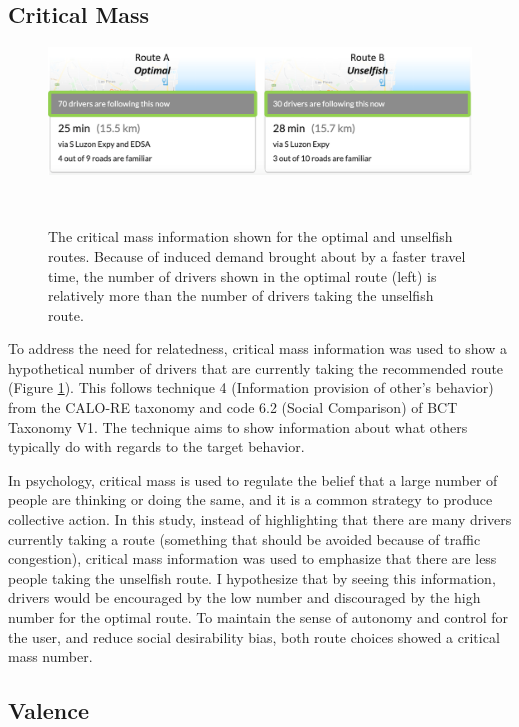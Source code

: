 \subsection{Critical Mass}
\begin{figure}[h]
\centering
  \includegraphics[scale=0.4]{figures/s3-critimass.png}
  \caption{The critical mass information shown for the optimal and unselfish routes. Because of induced demand brought about by a faster travel time, the number of drivers shown in the optimal route (left) is relatively more than the number of drivers taking the unselfish route.}~\label{fig:s3-critmass}
\end{figure}

To address the need for relatedness, critical mass information was used to show a hypothetical number of drivers that are currently taking the recommended route (Figure \ref{fig:s3-critmass}). This follows technique 4 (Information provision of other's behavior) from the CALO-RE taxonomy\cite{michie2011refined} and code 6.2 (Social Comparison) of BCT Taxonomy V1\cite{michie2013behavior}. The technique aims to show information about what others typically do with regards to the target behavior. 

In psychology, critical mass is used to regulate the belief that a large number of people are thinking or doing the same, and it is a common strategy to produce collective action\cite{oliver1985theory}. In this study, instead of highlighting that there are many drivers currently taking a route (something that should be avoided because of traffic congestion), critical mass information was used to emphasize that there are less people taking the unselfish route. I hypothesize that by seeing this information, drivers would be encouraged by the low number and discouraged by the high number for the optimal route. To maintain the sense of autonomy and control for the user, and reduce social desirability bias, both route choices showed a critical mass number.

\subsection{Valence}

